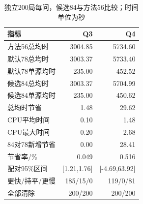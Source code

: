 \begin{table}[H]\centering\small\caption{独立200局每问，候选84与方法56比较；时间单位为秒}\begin{tabular}{lrr}\toprule 指标&Q3&Q4\\\midrule
方法56总均时&3004.85&5734.60\\
默认78总均时&3003.37&5733.40\\
默认78单源均时&235.00&452.52\\
候选84总均时&3003.37&5704.99\\
候选84单源均时&235.00&450.62\\
总均时节省&1.48&29.62\\
CPU平均时间&0.10&1.48\\
CPU最大时间&0.20&2.68\\
84对78新增节省&0.00&28.41\\
节省率/\%&0.049&0.516\\
配对95\%区间&[1.21,1.76]&[-4.69,63.92]\\
更快/持平/更慢&185/15/0&119/0/81\\
全部清除&200/200&200/200\\\bottomrule\end{tabular}\end{table}